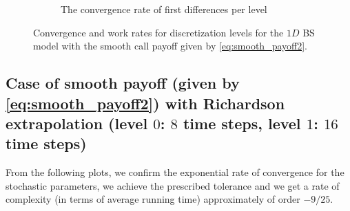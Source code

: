 \documentclass[11pt]{article}
\begin{document}
\begin{figure}[!h]
\begin{subfigure}{.5\textwidth}
		\caption{ The convergence rate of first differences per level}
		\label{fig:misc_1D_BS_16_steps_smooth_second_payoff_eps_10_5_sub4}
	\end{subfigure}%
	\caption{Convergence and work rates for discretization levels for the $1D$ BS model with the smooth call payoff given by \eqref{eq:smooth_payoff2}.}
	\label{fig:misc_1D_BS_16_steps_smooth_second_payoff_eps_10_5_2}
\end{figure}


\newpage

\subsection{Case of smooth payoff (given by \eqref{eq:smooth_payoff2}) with Richardson extrapolation (level $0$: $8$ time steps, level $1$: $16$ time steps)}
From the following plots, we confirm the exponential rate of convergence for the stochastic parameters, we achieve the prescribed tolerance and  we get a rate of complexity (in terms of average running time) approximately of order $-9/25$.
\end{document}
